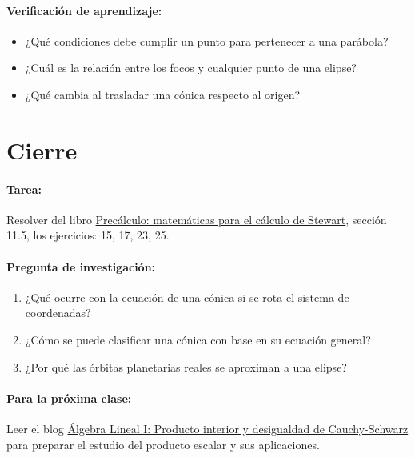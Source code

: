 \documentclass[a4,11pt]{aleph-notas}
\begin{document}
\paragraph{Verificación de aprendizaje:}  
\begin{itemize}[leftmargin=*]
    \item ¿Qué condiciones debe cumplir un punto para pertenecer a una parábola?
    \item ¿Cuál es la relación entre los focos y cualquier punto de una elipse?
    \item ¿Qué cambia al trasladar una cónica respecto al origen?
\end{itemize}

\section*{Cierre}

\paragraph{Tarea:}  
Resolver del libro \href{https://catalogobiblioteca.puce.edu.ec/cgi-bin/koha/opac-detail.pl?biblionumber=124311&query_desc=kw%2Cwrdl%3A%20precalculo}{Precálculo: matemáticas para el cálculo de Stewart}, sección 11.5, los ejercicios: 15, 17, 23, 25.

\paragraph{Pregunta de investigación:}  
\begin{enumerate}[leftmargin=*]
    \item ¿Qué ocurre con la ecuación de una cónica si se rota el sistema de coordenadas?
    \item ¿Cómo se puede clasificar una cónica con base en su ecuación general?
    \item ¿Por qué las órbitas planetarias reales se aproximan a una elipse?
\end{enumerate}

\paragraph{Para la próxima clase:}  
Leer el blog \href{https://blog.nekomath.com/algebra-lineal-i-producto-interior-y-desigualdad-de-cauchy-schwarz/}{Álgebra Lineal I: Producto interior y desigualdad de Cauchy-Schwarz} para preparar el estudio del producto escalar y sus aplicaciones.
\end{document}
